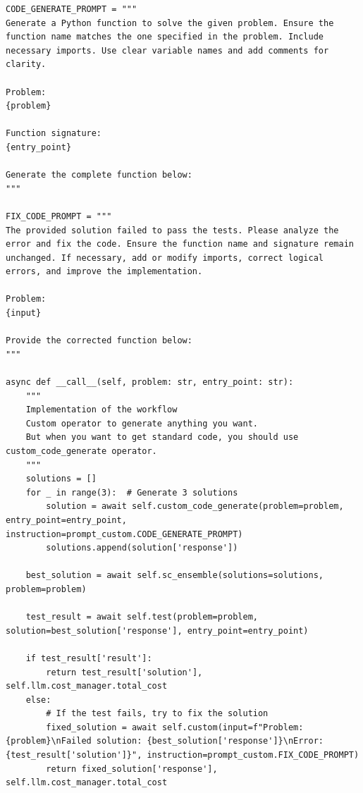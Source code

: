 \begin{tcolorbox}[title={\textbf{\small The optimal workflow generated for MBPP}}, boxrule=1pt, arc=0mm, colback=black!5!white, colframe=black!75!white, breakable, before skip=10pt, after skip=10pt, pad at break=2mm, parbox=false] \begin{verbatim}
CODE_GENERATE_PROMPT = """
Generate a Python function to solve the given problem. Ensure the function name matches the one specified in the problem. Include necessary imports. Use clear variable names and add comments for clarity.

Problem:
{problem}

Function signature:
{entry_point}

Generate the complete function below:
"""

FIX_CODE_PROMPT = """
The provided solution failed to pass the tests. Please analyze the error and fix the code. Ensure the function name and signature remain unchanged. If necessary, add or modify imports, correct logical errors, and improve the implementation.

Problem:
{input}

Provide the corrected function below:
"""

async def __call__(self, problem: str, entry_point: str):
    """
    Implementation of the workflow
    Custom operator to generate anything you want.
    But when you want to get standard code, you should use custom_code_generate operator.
    """
    solutions = []
    for _ in range(3):  # Generate 3 solutions
        solution = await self.custom_code_generate(problem=problem, entry_point=entry_point, instruction=prompt_custom.CODE_GENERATE_PROMPT)
        solutions.append(solution['response'])
    
    best_solution = await self.sc_ensemble(solutions=solutions, problem=problem)
    
    test_result = await self.test(problem=problem, solution=best_solution['response'], entry_point=entry_point)
    
    if test_result['result']:
        return test_result['solution'], self.llm.cost_manager.total_cost
    else:
        # If the test fails, try to fix the solution
        fixed_solution = await self.custom(input=f"Problem: {problem}\nFailed solution: {best_solution['response']}\nError: {test_result['solution']}", instruction=prompt_custom.FIX_CODE_PROMPT)
        return fixed_solution['response'], self.llm.cost_manager.total_cost
\end{verbatim}
\end{tcolorbox}

